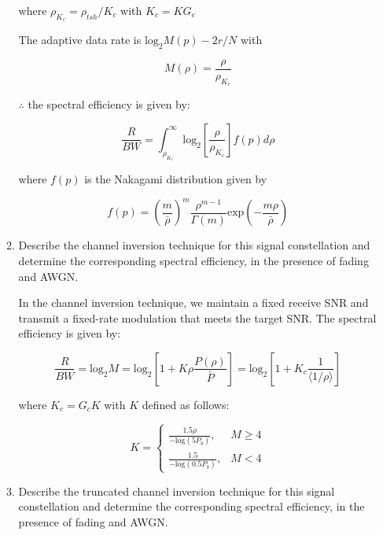 \documentclass[fleqn]{article}
\begin{document}
\begin{enumerate}
\begin{enumerate}
			where $\rho_{K_c} = \rho_{tsh}/K_c$ with $K_c = KG_c$
			
			The adaptive data rate is $\text{log}_2M(p)-2r/N$ with 
			
			\begin{equation*}
				M(\rho) = \frac{\rho}{\rho_{K_c}}
			\end{equation*}			
			 
			$\therefore$ the spectral efficiency is given by:
			
			\begin{equation*}
				\frac{R}{BW} = \int_{\rho_{K_c}}^{\infty}{\text{log}_2\left[\frac{\rho}{\rho_{K_c}}\right]f(p)d\rho}
			\end{equation*}
			
			where $f(p)$ is the Nakagami distribution given by
			
			\begin{equation*}
				f(p) = \left(\frac{m}{\bar{\rho}}\right)^m\frac{\rho^{m-1}}{\Gamma(m)}\text{exp}\left(-\frac{m\rho}{\bar{\rho}}\right)
			\end{equation*}
%			
			\item Describe the channel inversion technique for this signal constellation and determine the corresponding spectral efficiency, in the presence of fading and AWGN.
			
			In the channel inversion technique, we maintain a fixed receive SNR and transmit a fixed-rate modulation that meets the target SNR. The spectral efficiency is given by:
			
			\begin{equation*}
				\frac{R}{BW} = \text{log}_2{M} = \text{log}_2\left[1 + K\rho\frac{P(\rho)}{\bar{P}}\right] = \text{log}_2\left[1 + K_c\frac{1}{\langle1/\rho\rangle}\right]
			\end{equation*}
			
			where $K_c = G_cK$ with $K$ defined as follows:
			
			\begin{equation*}
				K = \begin{cases}
					\frac{1.5\rho}{-\text{log}(5P_b)}, & M \geq 4 \\
					\frac{1.5}{-\text{log}(0.5P_b)}, & M < 4
				\end{cases}
			\end{equation*}
			
			\item Describe the truncated channel inversion technique for this signal constellation and determine the corresponding spectral efficiency, in the presence of fading and AWGN.
			

\end{enumerate}
\end{enumerate}
\end{document}
